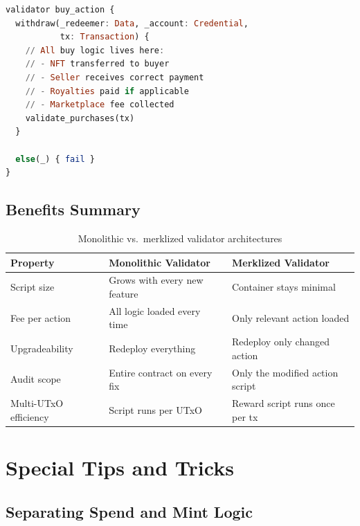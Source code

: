 \begin{lstlisting}[language=haskell, caption=Buy Action Script (Reward) in Aiken]
validator buy_action {
  withdraw(_redeemer: Data, _account: Credential,
           tx: Transaction) {
    // All buy logic lives here:
    // - NFT transferred to buyer
    // - Seller receives correct payment
    // - Royalties paid if applicable
    // - Marketplace fee collected
    validate_purchases(tx)
  }

  else(_) { fail }
}
\end{lstlisting}

\subsection{Benefits Summary}

\begin{table}[ht]
\centering
\small
\begin{tabular}{|l|p{4.5cm}|p{4.5cm}|}
\hline
\textbf{Property} & \textbf{Monolithic Validator} & \textbf{Merklized Validator} \\ \hline
Script size & Grows with every new feature & Container stays minimal \\ \hline
Fee per action & All logic loaded every time & Only relevant action loaded \\ \hline
Upgradeability & Redeploy everything & Redeploy only changed action \\ \hline
Audit scope & Entire contract on every fix & Only the modified action script \\ \hline
Multi-UTxO efficiency & Script runs per UTxO & Reward script runs once per tx \\ \hline
\end{tabular}
\caption{Monolithic vs.\ merklized validator architectures}
\end{table}

\section{Special Tips and Tricks} \label{sec:tips-tricks}

\subsection{Separating Spend and Mint Logic}

